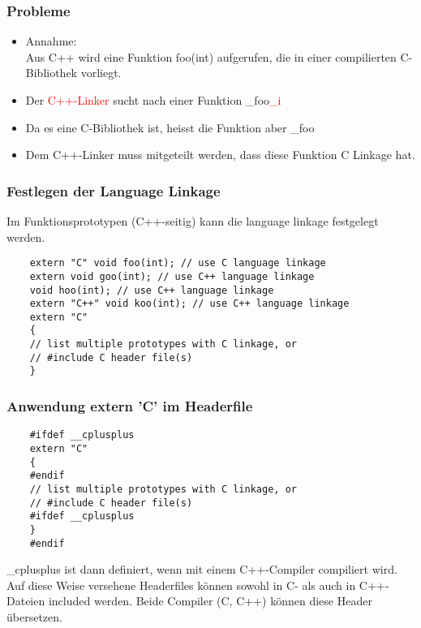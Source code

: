 \subsubsection{Probleme}
\begin{itemize}
    \item Annahme:\\Aus C++ wird eine Funktion foo(int) aufgerufen, die in einer compilierten
    C-Bibliothek vorliegt.
    \item Der \textcolor{red}{C++-Linker} sucht nach einer Funktion \_foo\textcolor{red}{\_i}
    \item Da es eine C-Bibliothek ist, heisst die Funktion aber \_foo
    \item Dem C++-Linker muss mitgeteilt werden, dass diese Funktion C Linkage hat.
\end{itemize}

\subsubsection{Festlegen der Language Linkage}
Im Funktionsprototypen (C++-seitig) kann die language linkage festgelegt werden.
\begin{lstlisting}
    extern "C" void foo(int); // use C language linkage
    extern void goo(int); // use C++ language linkage
    void hoo(int); // use C++ language linkage
    extern "C++" void koo(int); // use C++ language linkage
    extern "C"
    {
    // list multiple prototypes with C linkage, or
    // #include C header file(s)
    }
\end{lstlisting}
\newpage

\subsubsection{Anwendung extern 'C' im Headerfile}
\begin{multicols}{2}
\begin{lstlisting}
    #ifdef __cplusplus
    extern "C"
    {
    #endif
    // list multiple prototypes with C linkage, or
    // #include C header file(s)
    #ifdef __cplusplus
    }
    #endif
\end{lstlisting}
\vfill\null
\columnbreak
\_cplusplus ist dann definiert, wenn mit einem C++-Compiler compiliert wird.
Auf diese Weise versehene Headerfiles können sowohl in C‐ als auch in C++‐Dateien included 
werden. Beide Compiler (C, C++) k\"onnen diese Header \"ubersetzen.
\end{multicols}

